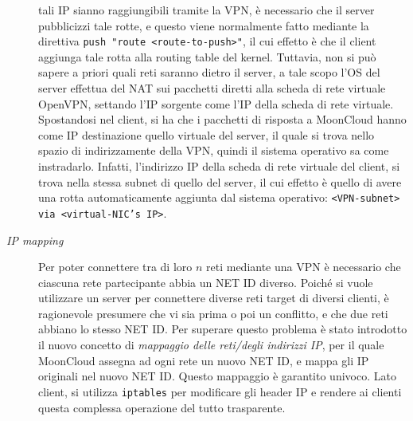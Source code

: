 \begin{description}
  tali IP sianno raggiungibili tramite la VPN, è necessario che il server
  pubblicizzi tale rotte, e questo viene normalmente fatto mediante la direttiva
  \texttt{push "route <route-to-push>"}, il cui effetto è che il client aggiunga
  tale rotta alla routing table del kernel. Tuttavia, non si può sapere a priori
  quali reti saranno dietro il server, a tale scopo l'OS del server
  effettua del NAT sui pacchetti diretti alla scheda di rete virtuale OpenVPN,
  settando l'IP sorgente come l'IP della scheda di rete virtuale. Spostandosi
  nel client, si ha che i pacchetti di risposta a MoonCloud hanno come IP destinazione
  quello virtuale del server, il quale si trova nello spazio di indirizzamente della
  VPN, quindi il sistema operativo sa come instradarlo. Infatti, l'indirizzo IP
  della scheda di rete virtuale del client, si trova nella stessa subnet di quello
  del server, il cui effetto è quello di avere una rotta automaticamente aggiunta
  dal sistema operativo: \texttt{<VPN-subnet> via <virtual-NIC's IP>}.
  \item[\textit{IP mapping}]Per poter connettere tra di loro $n$ reti mediante
  una VPN è necessario che ciascuna rete partecipante abbia un NET ID diverso. Poiché
  si vuole utilizzare un server per connettere diverse reti target di diversi clienti,
  è ragionevole presumere che vi sia prima o poi un conflitto, e che due reti abbiano
  lo stesso NET ID. Per superare questo problema è stato introdotto il nuovo concetto
  di \textit{mappaggio delle reti/degli indirizzi IP}, per il quale MoonCloud assegna
  ad ogni rete un nuovo NET ID, e mappa gli IP originali nel nuovo NET ID. Questo
  mappaggio è garantito univoco. Lato client, si utilizza \texttt{iptables} per
  modificare gli header IP e rendere ai clienti questa complessa operazione del tutto
  trasparente.
\end{description}
